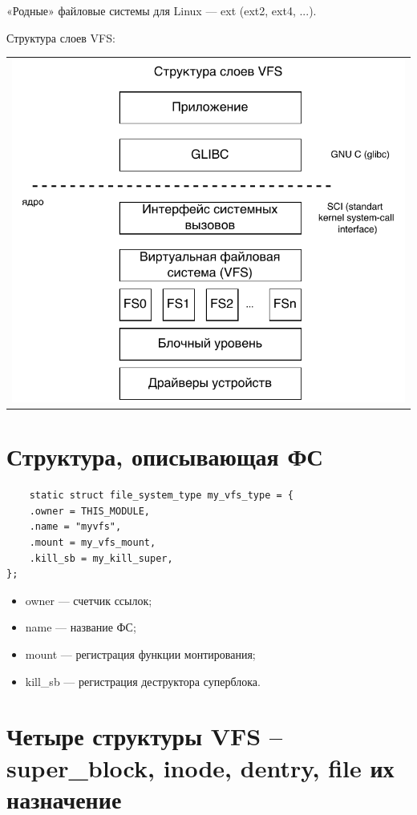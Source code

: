 «Родные» файловые системы для Linux — ext (ext2, ext4, ...).

Структура слоев VFS:

\begin{table}[h!]
  \centering
  \begin{tabular}{p{1\linewidth}}
    \centering
    \includegraphics[width=0.8\linewidth]{./images/VFS_struct.pdf}
  \end{tabular}
\end{table}

\section{Структура, описывающая ФС}

\begin{lstlisting}
	static struct file_system_type my_vfs_type = {
    .owner = THIS_MODULE,
    .name = "myvfs",
    .mount = my_vfs_mount,
    .kill_sb = my_kill_super,
};
\end{lstlisting}

\begin{itemize}
	\item owner --- счетчик ссылок;
	\item name --- название ФС;
	\item mount --- регистрация функции монтирования;
	\item kill\_sb --- регистрация деструктора суперблока.
\end{itemize}

\section{Четыре структуры VFS – super\_block, inode, dentry, file их назначение}

